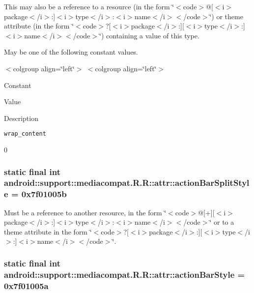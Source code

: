 This may also be a reference to a resource (in the form \char`\"{}$<$code$>$@\mbox{[}$<$i$>$package$<$/i$>$:\mbox{]}$<$i$>$type$<$/i$>$:$<$i$>$name$<$/i$>$$<$/code$>$\char`\"{}) or theme attribute (in the form \char`\"{}$<$code$>$?\mbox{[}$<$i$>$package$<$/i$>$:\mbox{]}\mbox{[}$<$i$>$type$<$/i$>$:\mbox{]}$<$i$>$name$<$/i$>$$<$/code$>$\char`\"{}) containing a value of this type. 

May be one of the following constant values. \begin{TabularC}{0}
\hline
\end{TabularC}
$<$colgroup align=\char`\"{}left\char`\"{}$>$ $<$colgroup align=\char`\"{}left\char`\"{}$>$ 

Constant

Value

Description 

{\tt wrap\_\-content}

0\hypertarget{classandroid_1_1support_1_1mediacompat_1_1_r_1_1attr_f3e7e65f8d3a24de174ab5cf8d2841f0}{
\subsubsection[{actionBarSplitStyle}]{\setlength{\rightskip}{0pt plus 5cm}static final int android::support::mediacompat.R.R::attr::actionBarSplitStyle = 0x7f01005b}}
\label{classandroid_1_1support_1_1mediacompat_1_1_r_1_1attr_f3e7e65f8d3a24de174ab5cf8d2841f0}


Must be a reference to another resource, in the form \char`\"{}$<$code$>$@\mbox{[}+\mbox{]}\mbox{[}$<$i$>$package$<$/i$>$:\mbox{]}$<$i$>$type$<$/i$>$:$<$i$>$name$<$/i$>$$<$/code$>$\char`\"{} or to a theme attribute in the form \char`\"{}$<$code$>$?\mbox{[}$<$i$>$package$<$/i$>$:\mbox{]}\mbox{[}$<$i$>$type$<$/i$>$:\mbox{]}$<$i$>$name$<$/i$>$$<$/code$>$\char`\"{}. \hypertarget{classandroid_1_1support_1_1mediacompat_1_1_r_1_1attr_cdc7db14a4990f775e8c8b4f3c4e0c08}{
\subsubsection[{actionBarStyle}]{\setlength{\rightskip}{0pt plus 5cm}static final int android::support::mediacompat.R.R::attr::actionBarStyle = 0x7f01005a}}
\label{classandroid_1_1support_1_1mediacompat_1_1_r_1_1attr_cdc7db14a4990f775e8c8b4f3c4e0c08}



